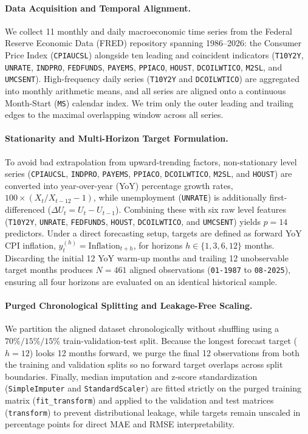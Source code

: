 \documentclass{article}
\begin{document}
\paragraph{Data Acquisition and Temporal Alignment.}
We collect 11 monthly and daily macroeconomic time series from the Federal Reserve Economic Data (FRED) repository spanning 1986--2026: the Consumer Price Index (\texttt{CPIAUCSL}) alongside ten leading and coincident indicators (\texttt{T10Y2Y}, \texttt{UNRATE}, \texttt{INDPRO}, \texttt{FEDFUNDS}, \texttt{PAYEMS}, \texttt{PPIACO}, \texttt{HOUST}, \texttt{DCOILWTICO}, \texttt{M2SL}, and \texttt{UMCSENT}). High-frequency daily series (\texttt{T10Y2Y} and \texttt{DCOILWTICO}) are aggregated into monthly arithmetic means, and all series are aligned onto a continuous Month-Start (\texttt{MS}) calendar index. We trim only the outer leading and trailing edges to the maximal overlapping window across all series.

\paragraph{Stationarity and Multi-Horizon Target Formulation.}
To avoid bad extrapolation from upward-trending factors, non-stationary level series (\texttt{CPIAUCSL}, \texttt{INDPRO}, \texttt{PAYEMS}, \texttt{PPIACO}, \texttt{DCOILWTICO}, \texttt{M2SL}, and \texttt{HOUST}) are converted into year-over-year (YoY) percentage growth rates, $100 \times (X_t / X_{t-12} - 1)$, while unemployment (\texttt{UNRATE}) is additionally first-differenced ($\Delta U_t = U_t - U_{t-1}$). Combining these with six raw level features (\texttt{T10Y2Y}, \texttt{UNRATE}, \texttt{FEDFUNDS}, \texttt{HOUST}, \texttt{DCOILWTICO}, and \texttt{UMCSENT}) yields $p = 14$ predictors. Under a direct forecasting setup, targets are defined as forward YoY CPI inflation, $y_t^{(h)} = \text{Inflation}_{t+h}$, for horizons $h \in \{1, 3, 6, 12\}$ months. Discarding the initial 12 YoY warm-up months and trailing 12 unobservable target months produces $N = 461$ aligned observations (\texttt{01-1987} to \texttt{08-2025}), ensuring all four horizons are evaluated on an identical historical sample.

\paragraph{Purged Chronological Splitting and Leakage-Free Scaling.}
We partition the aligned dataset chronologically without shuffling using a $70\% / 15\% / 15\%$ train-validation-test split. Because the longest forecast target ($h = 12$) looks 12 months forward, we purge the final 12 observations from both the training and validation splits so no forward target overlaps across split boundaries. Finally, median imputation and z-score standardization (\texttt{SimpleImputer} and \texttt{StandardScaler}) are fitted strictly on the purged training matrix (\texttt{fit\_transform}) and applied to the validation and test matrices (\texttt{transform}) to prevent distributional leakage, while targets remain unscaled in percentage points for direct MAE and RMSE interpretability.
\end{document}
